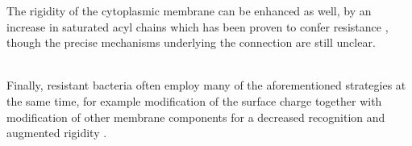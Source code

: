 The rigidity of the cytoplasmic membrane can be enhanced as well, by an increase in saturated acyl chains which has been proven to confer resistance \cite{Band2014,Kumariya2015}, though the precise mechanisms underlying the connection are still unclear.

\hspace{0.5cm}
\\
Finally, resistant bacteria often employ many of the aforementioned strategies at the same time, for example modification of the surface charge together with modification of other membrane components for a decreased recognition and augmented rigidity \cite{Raetz2007}.

